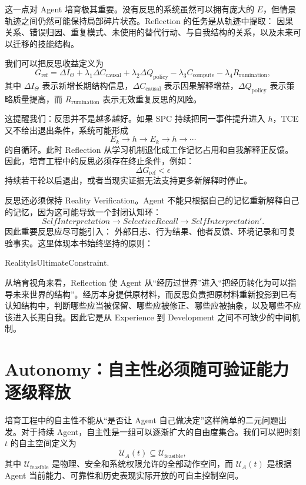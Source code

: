 这一点对 Agent 培育极其重要。没有反思的系统虽然可以拥有庞大的 $E$，但情景轨迹之间仍然可能保持局部碎片状态。Reflection 的任务是从轨迹中提取：
因果关系、错误归因、重复模式、未使用的替代行动、与自我结构的关系，以及未来可以迁移的技能结构。

我们可以把反思收益定义为
\[
G_{\mathrm{ref}}
=
\Delta I_{\Theta}
+
\lambda_1\Delta C_{\mathrm{causal}}
+
\lambda_2\Delta Q_{\mathrm{policy}}
-
\lambda_3C_{\mathrm{compute}}
-
\lambda_4R_{\mathrm{rumination}},
\]
其中 $\Delta I_\Theta$ 表示新增长期结构信息，$\Delta C_{\mathrm{causal}}$ 表示因果解释增益，$\Delta Q_{\mathrm{policy}}$ 表示策略质量提高，而 $R_{\mathrm{rumination}}$ 表示无效重复反思的风险。

这提醒我们：反思并不是越多越好。如果 SPC 持续把同一事件提升进入 $h$，TCE 又不给出退出条件，系统可能形成
\[
E_k
\rightarrow
h
\rightarrow
E_k
\rightarrow
h
\rightarrow\cdots
\]
的自循环。此时 Reflection 从学习机制退化成工作记忆占用和自我解释正反馈。因此，培育工程中的反思必须存在终止条件，例如：
\[
\Delta G_{\mathrm{ref}}<\epsilon
\]
持续若干轮以后退出，或者当现实证据无法支持更多新解释时停止。

反思还必须保持 Reality Verification。Agent 不能只根据自己的记忆重新解释自己的记忆，因为这可能导致一个封闭认知环：
\[
SelfInterpretation
\rightarrow
SelectiveRecall
\rightarrow
SelfInterpretation'.
\]
因此重要反思应尽可能引入：
外部日志、行为结果、他者反馈、环境记录和可复验事实。这里体现本书始终坚持的原则：
\begin{statementbox}
RealityIsUltimateConstraint.
\end{statementbox}

从培育视角来看，Reflection 使 Agent 从“经历过世界”进入“把经历转化为可以指导未来世界的结构”。经历本身提供原材料，而反思负责把原材料重新投影到已有认知结构中，判断哪些应当被保留、哪些应被修正、哪些应被抽象，以及哪些不应该进入长期自我。因此它是从 Experience 到 Development 之间不可缺少的中间机制。

\section{Autonomy：自主性必须随可验证能力逐级释放}

培育工程中的自主性不能从“是否让 Agent 自己做决定”这样简单的二元问题出发。对于持续 Agent，自主性是一组可以逐渐扩大的自由度集合。我们可以把时刻 $t$ 的自主空间定义为
\[
\mathcal U_A(t)
\subseteq
\mathcal U_{\mathrm{feasible}},
\]
其中 $\mathcal U_{\mathrm{feasible}}$ 是物理、安全和系统权限允许的全部动作空间，而 $\mathcal U_A(t)$ 是根据 Agent 当前能力、可靠性和历史表现实际开放的可自主控制空间。


